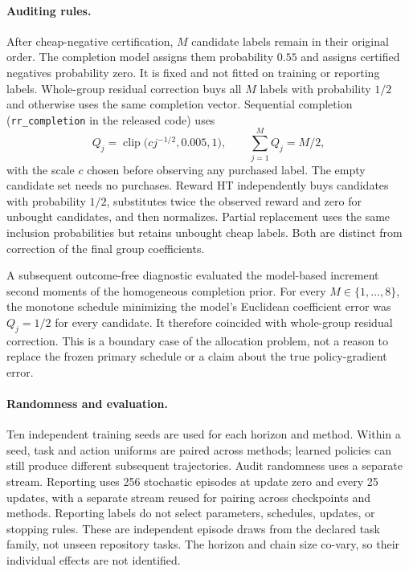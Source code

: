 \paragraph{Auditing rules.}
After cheap-negative certification, $M$ candidate labels remain in their
original order. The completion model assigns them probability $0.55$ and
assigns certified negatives probability zero. It is fixed and not fitted on
training or reporting labels. Whole-group residual correction buys all $M$
labels with probability $1/2$ and otherwise uses the same completion vector.
Sequential completion (\texttt{rr\_completion} in the released code) uses
\[
 Q_j=\operatorname{clip}\bigl(c j^{-1/2},0.005,1\bigr),
 \qquad \sum_{j=1}^{M}Q_j=M/2,
\]
with the scale $c$ chosen before observing any purchased label. The empty
candidate set needs no purchases. Reward HT independently buys candidates
with probability $1/2$, substitutes twice the observed reward and zero for
unbought candidates, and then normalizes. Partial replacement uses the same
inclusion probabilities but retains unbought cheap labels. Both are distinct
from correction of the final group coefficients.

A subsequent outcome-free diagnostic evaluated the model-based increment
second moments of the homogeneous completion prior. For every
$M\in\{1,\ldots,8\}$, the monotone schedule minimizing the model's Euclidean
coefficient error was $Q_j=1/2$ for every candidate. It therefore coincided
with whole-group residual correction. This is a boundary case of the
allocation problem, not a reason to replace the frozen primary schedule or
a claim about the true policy-gradient error.

\paragraph{Randomness and evaluation.}
Ten independent training seeds are used for each horizon and method. Within
a seed, task and action uniforms are paired across methods; learned policies
can still produce different subsequent trajectories. Audit randomness uses a
separate stream. Reporting uses 256 stochastic episodes at update zero and
every 25 updates, with a separate stream reused for pairing across checkpoints
and methods. Reporting labels do not select parameters, schedules, updates, or
stopping rules. These are independent episode draws from the declared task
family, not unseen repository tasks. The horizon and chain size co-vary, so
their individual effects are not identified.

